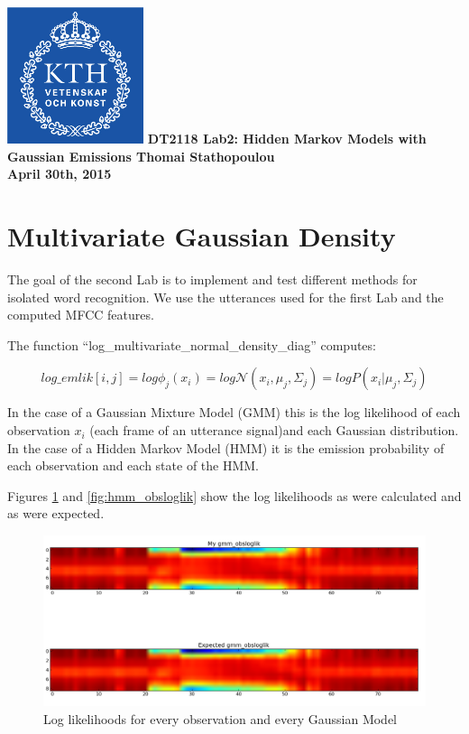 \documentclass[12pt,a4paper,oneside]{article}
\begin{document}
\begin{titlepage}

\centering
	\includegraphics[width=4cm]{logo.jpg}
	\vfill
    {\bfseries\Large
        DT2118 Lab2: Hidden Markov Models with Gaussian Emissions
        \vskip1cm
        Thomai Stathopoulou\\
        \vskip1cm
        April 30th, 2015
    }    
   \vfill
\end{titlepage}

\section{Multivariate Gaussian Density}
The goal of the second Lab is to implement and test different methods for isolated word recognition. We use the utterances used for the first Lab and the computed MFCC features.

The function ``log\_multivariate\_normal\_density\_diag'' computes:

\begin{equation}
log\_emlik[i, j] = log\phi_j(x_i) = log\mathcal{N}(x_i, \mu_j, \Sigma_j) = logP(x_i | \mu_j, \Sigma_j)
\end{equation}

In the case of a Gaussian Mixture Model (GMM) this is the log likelihood of each observation $x_i$ (each frame of an utterance signal)and each Gaussian distribution. In the case of a Hidden Markov Model (HMM) it is the emission probability of each observation and each state of the HMM.

Figures \ref{fig:gmm_obsloglik} and \ref{fig:hmm_obsloglik} show the log likelihoods as were calculated and as were expected.


\begin{figure}[h]
\includegraphics[scale=0.4]{../gmm_obsloglik.png}
\caption{Log likelihoods for every observation and every Gaussian Model}
\label{fig:gmm_obsloglik}
\end{figure}
\end{document}
